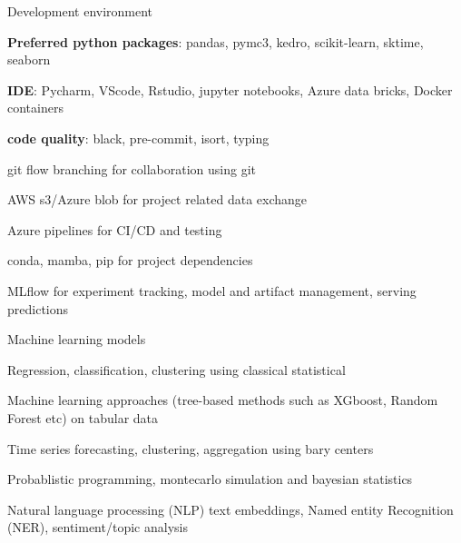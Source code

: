 \begin{cvskills}
    \cvskill
        {Development environment \hfill}
        {
        \begin{cvitems}
            \item \textbf{Preferred python packages}: pandas, pymc3, kedro, scikit-learn, sktime, seaborn
            \item \textbf{IDE}: Pycharm, VScode, Rstudio, jupyter notebooks, Azure data bricks, Docker containers
            \item \textbf{code quality}: black, pre-commit, isort, typing
            \item git flow branching for collaboration using git
            \item AWS s3/Azure blob for project related data exchange
            \item Azure pipelines for CI/CD and testing
            \item conda, mamba, pip for project dependencies
            \item MLflow for experiment tracking, model and artifact management, serving predictions
        \end{cvitems}
        }
        \cvskill
        {Machine learning models\hfill}
        {
        \begin{cvitems}
            \item Regression, classification, clustering using classical statistical 
            \item Machine learning approaches (tree-based methods such as XGboost, Random Forest etc) on tabular data
            \item Time series forecasting, clustering, aggregation using bary centers 
            \item Probablistic programming, montecarlo simulation and bayesian statistics
            \item Natural language processing (NLP) text embeddings, Named entity Recognition (NER), sentiment/topic analysis
        \end{cvitems}
    }
\end{cvskills}
